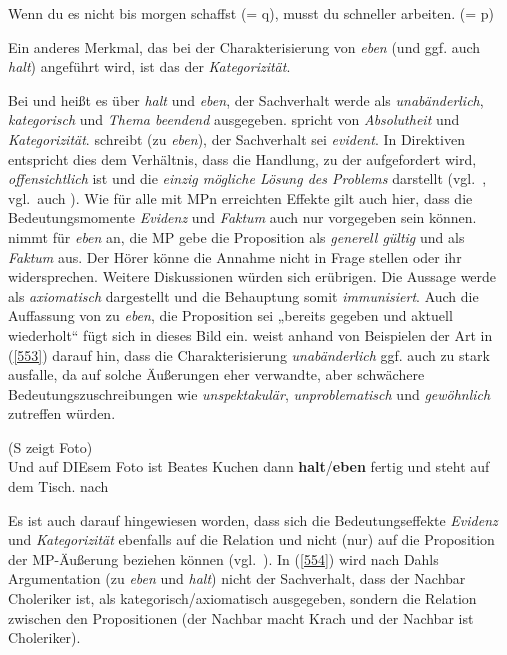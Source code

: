 \begin{exe}
	\ex\label{552}\small
	Wenn du es nicht bis morgen schaffst (= q), musst du schneller arbeiten. (= p)
\end{exe}
Ein anderes Merkmal, das bei der Charakterisierung von \textit{eben} (und ggf. auch \textit{halt}) angeführt wird, ist das der \textit{Kategorizität}. 

Bei \citet[120--121]{Helbig1990} und \citet[340]{Karagjosova2003} heißt es über \textit{halt} und \textit{eben}, der Sachverhalt werde als \textit{unabänderlich}, \textit{kategorisch} und \textit{Thema beendend} ausgegeben. \citet[80/83]{Autenrieth2002} spricht von \textit{Absolutheit} und \textit{Kategorizität}. \citet[120]{Thurmair1989} schreibt (zu \textit{eben}), der Sachverhalt sei \textit{evident}. In Direktiven entspricht dies dem Verhältnis, dass die Handlung, zu der aufgefordert wird, \textit{offensichtlich} ist und die \textit{einzig mögliche Lösung des Problems} darstellt (vgl.\ \citealt[122]{Thurmair1989}, vgl.\ auch \citealt[169]{Hentschel1986}). Wie für alle mit MPn erreichten Effekte gilt auch hier, dass die Bedeutungsmomente \textit{Evidenz} und \textit{Faktum} auch nur vorgegeben sein können. \citet[320--323]{Troemel-Ploetz1979} nimmt für \textit{eben} an, die MP gebe die Proposition als \textit{generell gültig} und als \textit{Faktum} aus. Der Hörer könne die Annahme nicht in Frage stellen oder ihr widersprechen. Weitere Diskussionen würden sich erübrigen. Die Aussage werde als \textit{axiomatisch} dargestellt und die Behauptung somit \textit{immunisiert}. Auch die Auffassung von \citet[130]{Diewald1997} zu \textit{eben}, die Proposition sei „bereits gegeben und aktuell wiederholt“ fügt sich in dieses Bild ein. \citet{Autenrieth2002} weist anhand von Beispielen der Art in (\ref{553}) darauf hin, dass die Charakterisierung \textit{unabänderlich} ggf. auch zu stark ausfalle, da auf solche Äußerungen eher verwandte, aber schwächere Bedeutungs\-zuschreibungen wie \textit{unspektakulär}, \textit{unproblematisch} und \textit{gewöhnlich} zutreffen würden.

\begin{exe}
	\ex\label{553} 
	(S zeigt Foto)\\
	Und auf DIEsem Foto ist Beates Kuchen dann \textbf{halt}\slash\textbf{eben} fertig und steht auf dem Tisch.		
	\hfill\hbox{nach \citet[99]{Autenrieth2002}} 
\end{exe}
Es ist auch darauf hingewiesen worden, dass sich die Bedeutungseffekte \textit{Evidenz} und \textit{Kategorizität} ebenfalls auf die Relation und nicht (nur) auf die Proposition der MP-Äußerung beziehen können (vgl.\ \citealt[99]{Dahl1988}). In (\ref{554}) wird nach Dahls Argumentation (zu \textit{eben} und \textit{halt}) nicht der Sachverhalt, dass der Nachbar Choleriker ist, als kategorisch/axiomatisch ausgegeben, sondern die Relation zwischen den Propositionen (der Nachbar macht Krach und der Nachbar ist Choleriker).

